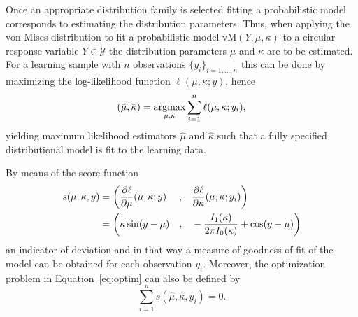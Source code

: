 \documentclass[nojss]{jss}
\newcommand{\argmax}{\operatorname{argmax}\displaylimits}
\numberwithin{equation}{section}
\begin{document}
Once an appropriate distribution family is selected fitting a probabilistic model corresponds to
estimating the distribution parameters. Thus, when applying the von Mises distribution to fit a 
probabilistic model $\text{vM}(Y, \mu, \kappa)$ to a circular response variable $Y \in \mathcal{Y}$ 
the distribution parameters $\mu$ and $\kappa$ are to be estimated.
For a learning sample with $n$ observations $\{y_i\}_{i=1,\ldots,n}$ this can be done by 
maximizing the log-likelihood function $\ell(\mu, \kappa; y)$, hence
\begin{equation}\label{eq:optim}
(\hat{\mu},\hat{\kappa}) = \argmax_{\mu,\kappa} \sum_{i=1}^n \ell(\mu, \kappa; y_i),
\end{equation}
yielding maximum likelihood estimators $\hat{\mu}$ and $\hat{\kappa}$ such that a fully specified 
distributional model is fit to the learning data.

By means of the score function
\begin{equation}
\label{eq:scores}
\begin{aligned}
s(\mu, \kappa, y) &= \bigg(\frac{\partial \ell}{\partial \mu}(\mu,\kappa; y)
\smallskip &,
\quad & \frac{\partial \ell}{\partial \kappa}(\mu,\kappa; y_i) \bigg) 
\\
&= \bigg(\kappa \sin(y-\mu)
\smallskip &,
\quad &-\frac{I_1(\kappa)}{2\pi I_0(\kappa)}+\cos(y-\mu) \bigg)
\end{aligned}
\end{equation}
an indicator of deviation and in that way a measure of goodness of fit of the model can be obtained 
for each observation $y_i$. Moreover, the optimization problem in Equation~\ref{eq:optim} can also 
be defined by 
\begin{equation}
\sum_{i = 1}^n s(\hat{\mu}, \hat{\kappa}, y_i) = 0.
\end{equation}
\end{document}
